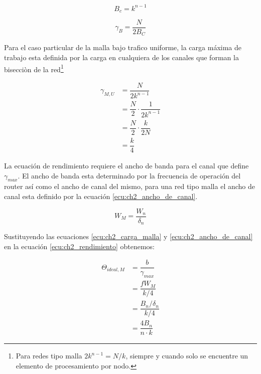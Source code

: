 \begin{equation}
	\label{ecu:ch2_biseccion}
		B_{c} = k^{n-1}
\end{equation}

\begin{equation}
	\label{ecu:ch2_carga_biseccion}
		\gamma_{B} = \dfrac{N}{2B_{C}}
\end{equation}

Para el caso particular de la malla bajo trafico uniforme, la carga máxima de trabajo esta definida por la carga en cualquiera de los canales que forman la bisecciòn de la red\footnote{Para redes tipo malla $2k^{n-1} = N/k$, siempre y cuando solo se encuentre un elemento de procesamiento por nodo.}

\begin{equation}
\label{ecu:ch2_carga_malla}
	\begin{split}
		\gamma_{M,U} &= \dfrac{N}{2k^{n-1}} \\
		             &= \dfrac{N}{2} \cdot \dfrac{1}{2k^{n-1}} \\
		             &= \dfrac{N}{2} \cdot \dfrac{k}{2N} \\
		             &= \dfrac{k}{4}
	\end{split}
\end{equation}

La ecuación de rendimiento requiere el ancho de banda para el canal que define $\gamma_{max}$. El ancho de banda esta determinado por la frecuencia de operación del router así como el ancho de canal del mismo, para una red tipo malla el ancho de canal esta definido por la ecuación \ref{ecu:ch2_ancho_de_canal}.

\begin{equation}
	\label{ecu:ch2_ancho_de_canal}
		W_{M} = \dfrac{W_{n}}{\delta_{n}}
\end{equation}

Sustituyendo las ecuaciones \ref{ecu:ch2_carga_malla} y \ref{ecu:ch2_ancho_de_canal} en la ecuación \ref{ecu:ch2_rendimiento} obtenemos:

\begin{equation}
	\label{ecu:ch2_rendimiento_malla}
		\begin{split}
			\Theta_{ideal, M} &= \dfrac{b}{\gamma_{max}} \\
			               &= \dfrac{fW_{M}}{k/4} \\ 
			               &= \dfrac{B_{n}/\delta_{n}}{k/4} \\
			               &= \dfrac{4B_{n}}{n\cdot k} 
		\end{split}
\end{equation}

